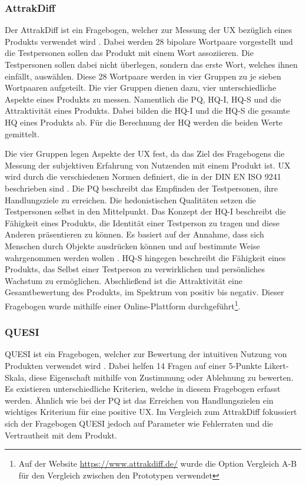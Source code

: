 \subsubsection{AttrakDiff}
Der AttrakDiff ist ein Fragebogen, welcher zur Messung der \ac{UX} bezüglich eines Produkts verwendet wird \cite{attrakdiff-2000, attrakdiff-2003, attrakdiff-2008}.
Dabei werden 28 bipolare Wortpaare vorgestellt und die Testpersonen sollen das Produkt mit einem Wort assoziieren.
Die Testpersonen sollen dabei nicht überlegen, sondern das erste Wort, welches ihnen einfällt, auswählen.
Diese 28 Wortpaare werden in vier Gruppen zu je sieben Wortpaaren aufgeteilt.
Die vier Gruppen dienen dazu, vier unterschiedliche Aspekte eines Produkts zu messen.
Namentlich die \ac{PQ}, \ac{HQ-I}, \ac{HQ-S} und die Attraktivität eines Produkts.
Dabei bilden die \ac{HQ-I} und die \ac{HQ-S} die gesamte \ac{HQ} eines Produkts ab.
Für die Berechnung der \ac{HQ} werden die beiden Werte gemittelt.

Die vier Gruppen legen Aspekte der \ac{UX} fest, da das Ziel des Fragebogens die Messung der subjektiven Erfahrung von Nutzenden mit einem Produkt ist.
\ac{UX} wird durch die verschiedenen Normen definiert, die in der DIN EN ISO 9241 beschrieben sind \cite{iso9241}.
Die \ac{PQ} beschreibt das Empfinden der Testpersonen, ihre Handlungsziele zu erreichen.
Die hedonistischen Qualitäten setzen die Testpersonen selbst in den Mittelpunkt.
Das Konzept der \ac{HQ-I} beschreibt die Fähigkeit eines Produkts, die Identität einer Testperson zu tragen und diese Anderen präsentieren zu können.
Es basiert auf der Annahme, dass sich Menschen durch Objekte ausdrücken können und auf bestimmte Weise wahrgenommen werden wollen \cite{prentice}.
\ac{HQ-S} hingegen beschreibt die Fähigkeit eines Produkts, das Selbst einer Testperson zu verwirklichen und persönliches Wachstum zu ermöglichen.
Abschließend ist die Attraktivität eine Gesamtbewertung des Produkts, im Spektrum von positiv bis negativ.
Dieser Fragebogen wurde mithilfe einer Online-Plattform durchgeführt\footnote{Auf der Website \url{https://www.attrakdiff.de/} wurde die Option \glqq Vergleich A-B\grqq{} für den Vergleich zwischen den Prototypen verwendet}.

\subsubsection{QUESI}
\ac{QUESI} ist ein Fragebogen, welcher zur Bewertung der intuitiven Nutzung von Produkten verwendet wird \cite{quesi-benchmarks, quesi-short}.
Dabei helfen 14 Fragen auf einer 5-Punkte Likert-Skala, diese Eigenschaft mithilfe von Zustimmung oder Ablehnung zu bewerten.
Es existieren unterschiedliche Kriterien, welche in diesem Fragebogen erfasst werden.
Ähnlich wie bei der \ac{PQ} ist das Erreichen von Handlungszielen ein wichtiges Kriterium für eine positive \ac{UX}.
Im Vergleich zum AttrakDiff fokussiert sich der Fragebogen \ac{QUESI} jedoch auf Parameter wie Fehlerraten und die Vertrautheit mit dem Produkt.\\

